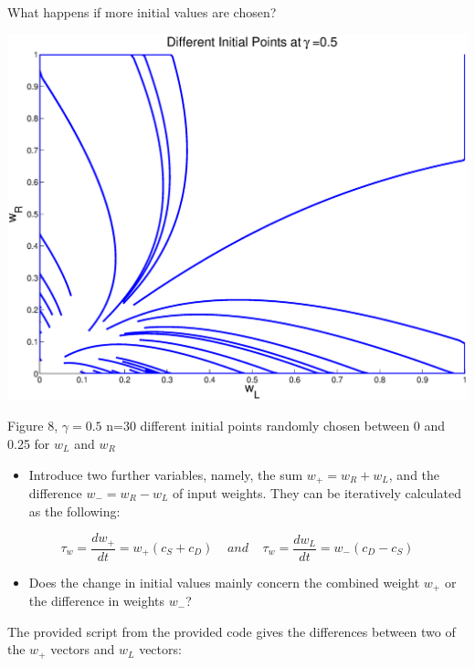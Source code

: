 \documentclass{article}
\begin{document}
What happens if more initial values are chosen?

\begin{center}
\includegraphics[width=\textwidth]{n_initial.eps}
\begin{footnotesize}
 Figure 8, $\gamma=0.5$ n=30 different initial points randomly chosen between 0 and 0.25 for $w_L$ and $w_R$
\end{footnotesize}
\end{center}

\begin{itemize}
 \item Introduce two further variables, namely, the sum $w_+=w_R+w_L$, and the difference $w_-=w_R-w_L$ of input weights. They can be iteratively calculated as the following: 
\end{itemize}

\begin{equation*}
 \tau_w=\frac{dw_+}{dt}=w_+(c_S+ c_D) \;\;\;\; and \;\;\;\; \tau_w=\frac{dw_L}{dt}=w_-(c_D-c_S)
\end{equation*}

\begin{itemize}
 \item Does the change in initial values mainly concern the combined weight $w_+$ or the difference in weights $w_-$?
\end{itemize}

The provided script from the provided code gives the differences between two of the $w_+$ vectors and $w_L$ vectors:
\end{document}
